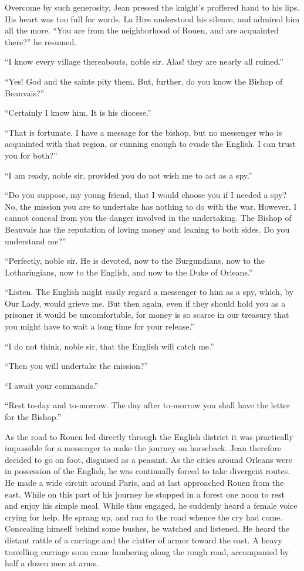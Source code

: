 Overcome by such generosity, Jean pressed the knight's proffered hand to
his lips. His heart was too full for words. La Hire understood his
silence, and admired him all the more. ``You are from the neighborhood
of Rouen, and are acquainted there?'' he resumed.

``I know every village thereabouts, noble sir. Alas! they are nearly all
ruined.''

``Yes! God and the saints pity them. But, further, do you know the
Bishop of Beauvais?''

``Certainly I know him. It is his diocese.''

``That is fortunate. I have a message for the bishop, but no messenger
who is acquainted with that region, or cunning enough to evade the
English. I can trust you for both?''

``I am ready, noble sir, provided you do not wish me to act as a spy.''

``Do you suppose, my young friend, that I would choose you if I needed a
spy? No, the mission you are to undertake has nothing to do with the
war. However, I cannot conceal from you the danger involved in the
undertaking. The Bishop of Beauvais has the reputation of loving money
and leaning to both sides. Do you understand me?''

``Perfectly, noble sir. He is devoted, now to the Burgundians, now to
the Lotharingians, now to the English, and now to the Duke of Orleans.''

``Listen. The English might easily regard a messenger to him as a spy,
which, by Our Lady, would grieve me. But then again, even if they should
hold you as a prisoner it would be uncomfortable, for money is so scarce
in our treasury that you might have to wait a long time for your
release.''

``I do not think, noble sir, that the English will catch me.''

``Then you will undertake the mission?''

``I await your commands.''

``Rest to-day and to-morrow. The day after to-morrow you shall have the
letter for the Bishop.''

As the road to Rouen led directly through the English district it was
practically impossible for a messenger to make the journey on horseback.
Jean therefore decided to go on foot, disguised as a peasant. As the
cities around Orleans were in possession of the English, he was
continually forced to take divergent routes. He made a wide circuit
around Paris, and at last approached Rouen from the east. While on this
part of his journey he stopped in a forest one noon to rest and enjoy
his simple meal. While thus engaged, he suddenly heard a female voice
crying for help. He sprang up, and ran to the road whence the cry had
come. Concealing himself behind some bushes, he watched and listened. He
heard the distant rattle of a carriage and the clatter of armor toward
the east. A heavy travelling carriage soon came lumbering along the
rough road, accompanied by half a dozen men at arms.

